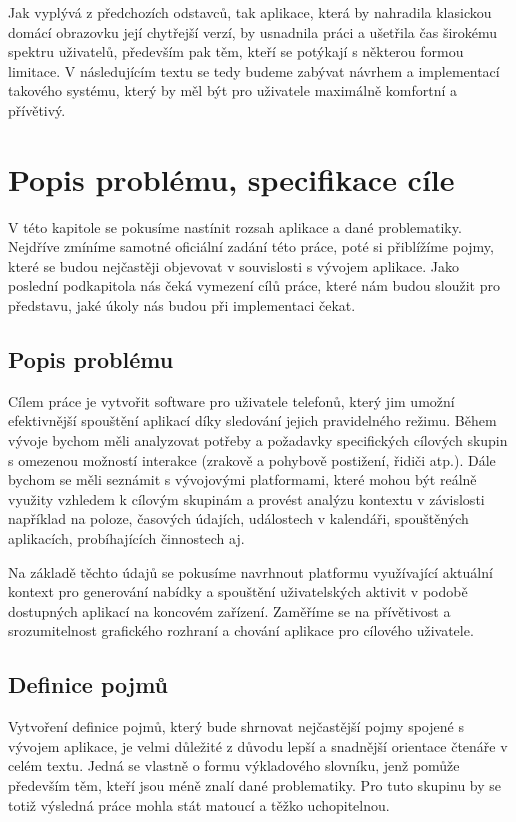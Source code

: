\documentclass[thesis=M,czech]{FITthesis}[2012/06/26]
\begin{document}
\begin{introduction}
Jak vyplývá z předchozích odstavců, tak aplikace, která by nahradila klasickou domácí obrazovku její chytřejší verzí, by usnadnila práci a ušetřila čas širokému spektru uživatelů, především pak těm, kteří se potýkají s některou formou limitace. V následujícím textu se tedy budeme zabývat návrhem a implementací takového systému, který by měl být pro uživatele maximálně komfortní a přívětivý.

\section{Popis problému, specifikace cíle}

V této kapitole se pokusíme nastínit rozsah aplikace a dané problematiky. Nejdříve zmíníme samotné oficiální zadání této práce, poté si přiblížíme pojmy, které se budou nejčastěji objevovat v souvislosti s vývojem aplikace. Jako poslední podkapitola nás čeká vymezení cílů práce, které nám budou sloužit pro představu, jaké úkoly nás budou při implementaci čekat.

\subsection{Popis problému}

Cílem práce je vytvořit software pro uživatele  telefonů, který jim umožní efektivnější spouštění aplikací díky sledování jejich pravidelného režimu. Během vývoje bychom měli analyzovat potřeby a požadavky specifických cílových skupin s omezenou možností interakce (zrakově a pohybově postižení, řidiči atp.). Dále bychom se měli seznámit s vývojovými platformami, které mohou být reálně využity vzhledem k cílovým skupinám a provést analýzu kontextu v závislosti například na poloze, časových údajích, událostech v kalendáři, spouštěných aplikacích, probíhajících činnostech aj.

Na základě těchto údajů se pokusíme navrhnout platformu využívající aktuální kontext pro generování nabídky a spouštění uživatelských aktivit v podobě dostupných aplikací na koncovém zařízení. Zaměříme se na přívětivost a srozumitelnost grafického rozhraní a chování aplikace pro cílového uživatele.

\subsection{Definice pojmů}

Vytvoření definice pojmů, který bude shrnovat nejčastější pojmy spojené s vývojem aplikace, je velmi důležité z důvodu lepší a snadnější orientace čtenáře v celém textu. Jedná se vlastně o formu výkladového slovníku, jenž pomůže především těm, kteří jsou méně znalí dané problematiky. Pro tuto skupinu by se totiž výsledná práce mohla stát matoucí a těžko uchopitelnou.


\end{introduction}
\end{document}
